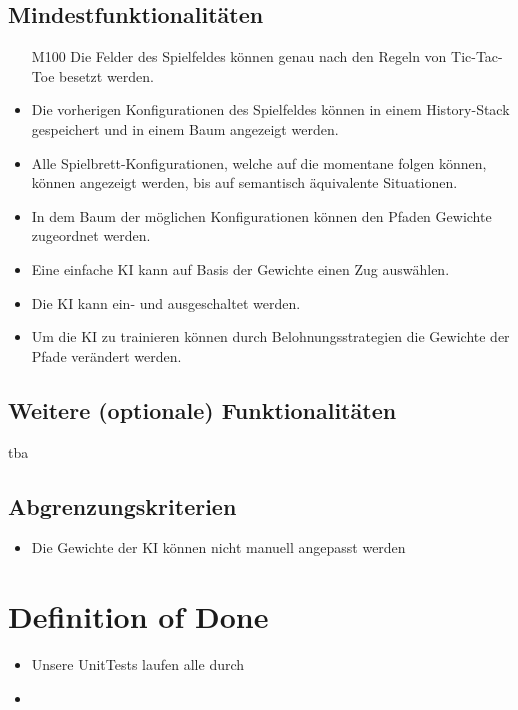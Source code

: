 \documentclass[titlepage]{scrartcl}
\begin{document}
\subsection{Mindestfunktionalitäten}
		\begin{itemize}
			\item[M100] Die Felder des Spielfeldes können genau nach den Regeln von Tic-Tac-Toe besetzt werden.
			\item Die vorherigen Konfigurationen des Spielfeldes können in einem History-Stack gespeichert und in einem Baum angezeigt werden.
			\item Alle Spielbrett-Konfigurationen, welche auf die momentane folgen können, können angezeigt werden, bis auf semantisch äquivalente Situationen.
			\item In dem Baum der möglichen Konfigurationen können den Pfaden Gewichte zugeordnet werden.
			\item Eine einfache KI kann auf Basis der Gewichte einen Zug auswählen.
			\item Die KI kann ein- und ausgeschaltet werden.
			\item Um die KI zu trainieren können durch Belohnungsstrategien die Gewichte der Pfade verändert werden.
		\end{itemize}
\subsection{Weitere (optionale) Funktionalitäten}
	tba
\subsection{Abgrenzungskriterien}
	\begin{itemize}
		\item Die Gewichte der KI können nicht manuell angepasst werden
	\end{itemize}
\section{Definition of Done}%
\begin{itemize}
	\item Unsere UnitTests laufen alle durch
	\item 
\end{itemize}
\end{document}
